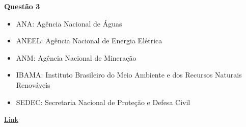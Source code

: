 \item[]\textbf{Questão 3}

\begin{itemize}
	\item ANA: Agência Nacional de Águas
	\item ANEEL: Agência Nacional de Energia Elétrica
	\item ANM: Agência Nacional de Mineração
	\item IBAMA: Instituto Brasileiro do Meio Ambiente e dos Recursos Naturais Renováveis
	\item SEDEC: Secretaria Nacional de Proteção e Defesa Civil
\end{itemize}

\href{https://www.ana.gov.br/noticias/orgaos-federais-se-unem-para-atuacao-conjunta-em-seguranca-de-barragens}{Link}